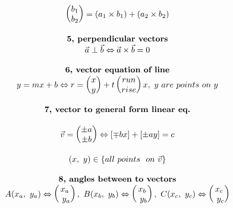 \documentclass{article}
\begin{document}
\begin{multicols}{2}
\[\begin{array}{>{\displaystyle}c}
\begin{pmatrix}
        b_{1}\\
        b_{2}
        \end{pmatrix} =( a_{1} \times b_{1}) +( a_{2} \times b_{2})\\
        \\
        \textbf{5, perpendicular\ vectors}\\
        \vec{a} \perp \vec{b} \Leftrightarrow \vec{a} \times \vec{b} =0\\
        \\
        \textbf{6, vector\ equation\ of\ line}\\
        y=mx+b\Leftrightarrow r=\begin{pmatrix}
        x\\
        y
        \end{pmatrix} +t\begin{pmatrix}
        run\\
        rise
        \end{pmatrix} {x,\ y\ are\ points\ on\ y}\\
        \\
        \textbf{7, vector\ to\ general\ form\ linear\ eq.}\\
        \\
        \vec{v} =\begin{pmatrix}
        \pm a\\
        \pm b
        \end{pmatrix} \Leftrightarrow [ \mp bx] +[ \pm ay] =c\\
        \\
        ( x,\ y) \in \{all\ points\ \ on\ \vec{v}\}\\
        \\
        \textbf{8, angles\ between\ to\ vectors}\\
        A( x_{a} ,\ y_{a}) \Leftrightarrow \begin{pmatrix}
        x_{a}\\
        \ y_{a}
        \end{pmatrix} ,\ B( x_{b} ,\ y_{b}) \Leftrightarrow \begin{pmatrix}
        x_{b}\\
        \ y_{b}
        \end{pmatrix} ,\ C( x_{c} ,\ y_{c}) \Leftrightarrow \begin{pmatrix}
        x_{c}\\
        \ y_{c}
        \end{pmatrix}\\
        \\

\end{array}\]
\end{multicols}
\end{document}
